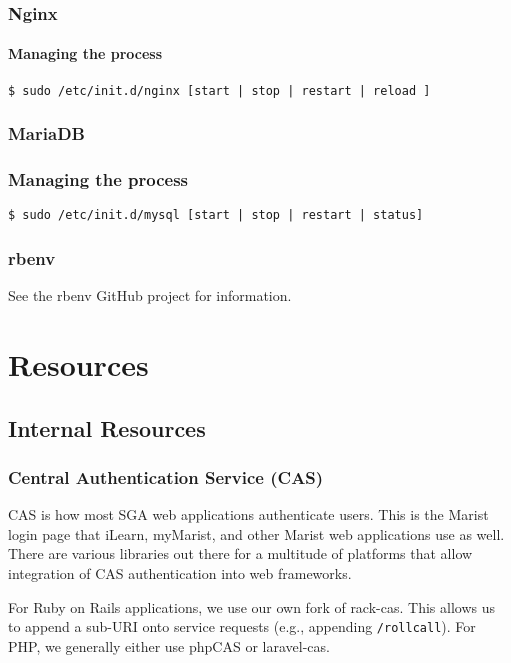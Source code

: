 \documentclass[11pt]{report}
\begin{document}
		\subsection{Nginx}
			\subsubsection{Managing the process}
				\begin{lstlisting}
$ sudo /etc/init.d/nginx [start | stop | restart | reload ]
				\end{lstlisting}
		\subsection{MariaDB}
			\subsection{Managing the process}
				\begin{lstlisting}
$ sudo /etc/init.d/mysql [start | stop | restart | status]
				\end{lstlisting}
		
		\subsection{rbenv}
			See the rbenv GitHub project for information.


\chapter{Resources}
	\section{Internal Resources}
		\subsection{Central Authentication Service (CAS)}
			CAS is how most SGA web applications authenticate users. This is the Marist login page that iLearn, myMarist, and other Marist web applications use as well. There are various libraries out there for a multitude of platforms that allow integration of CAS authentication into web frameworks.

			For Ruby on Rails applications, we use our own fork of rack-cas. This allows us to append a sub-URI onto service requests (e.g., appending \texttt{/rollcall}). For PHP, we generally either use phpCAS or laravel-cas.
\end{document}

